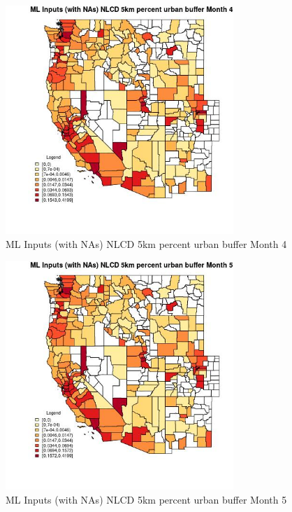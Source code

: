 \begin{figure} 
\centering  
\includegraphics[width=0.77\textwidth]{Code_Outputs/Report_ML_input_PM25_Step4_part_f_de_duplicated_aves_prioritize_24hr_obswNAs_CountyNLCD_5km_percent_urban_buffermedianMonth4.jpg} 
\caption{\label{fig:Report_ML_input_PM25_Step4_part_f_de_duplicated_aves_prioritize_24hr_obswNAsCountyNLCD_5km_percent_urban_buffermedianMonth4}ML Inputs (with NAs) NLCD 5km percent urban buffer Month 4} 
\end{figure} 
 

\begin{figure} 
\centering  
\includegraphics[width=0.77\textwidth]{Code_Outputs/Report_ML_input_PM25_Step4_part_f_de_duplicated_aves_prioritize_24hr_obswNAs_CountyNLCD_5km_percent_urban_buffermedianMonth5.jpg} 
\caption{\label{fig:Report_ML_input_PM25_Step4_part_f_de_duplicated_aves_prioritize_24hr_obswNAsCountyNLCD_5km_percent_urban_buffermedianMonth5}ML Inputs (with NAs) NLCD 5km percent urban buffer Month 5} 
\end{figure} 
 

